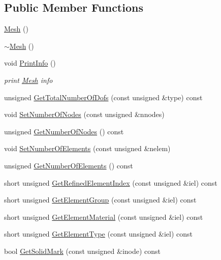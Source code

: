 \subsection*{Public Member Functions}
\begin{DoxyCompactItemize}
\item 
\mbox{\hyperlink{classfemus_1_1_mesh_a9e328b911a0225c8113601ac7aa36947}{Mesh}} ()
\item 
\mbox{\hyperlink{classfemus_1_1_mesh_a265aea095cc8facdfee8323c695fdc34}{$\sim$\+Mesh}} ()
\item 
void \mbox{\hyperlink{classfemus_1_1_mesh_aed86b865485ae162537e960cb5067534}{Print\+Info}} ()
\begin{DoxyCompactList}\small\item\em print \mbox{\hyperlink{classfemus_1_1_mesh}{Mesh}} info \end{DoxyCompactList}\item 
unsigned \mbox{\hyperlink{classfemus_1_1_mesh_afda8ae7465daaa274ea35dac5d8c3dc1}{Get\+Total\+Number\+Of\+Dofs}} (const unsigned \&type) const
\item 
void \mbox{\hyperlink{classfemus_1_1_mesh_aa55f34434829bad6e0fed904a40f271c}{Set\+Number\+Of\+Nodes}} (const unsigned \&nnodes)
\item 
unsigned \mbox{\hyperlink{classfemus_1_1_mesh_af2c24133f4e09b566e6d92bcc3a417c3}{Get\+Number\+Of\+Nodes}} () const
\item 
void \mbox{\hyperlink{classfemus_1_1_mesh_ac3c20a1d205b9f0aff0abb34d5de6d4c}{Set\+Number\+Of\+Elements}} (const unsigned \&nelem)
\item 
unsigned \mbox{\hyperlink{classfemus_1_1_mesh_ab5bcfd4be738d47ae025a06eddc66f61}{Get\+Number\+Of\+Elements}} () const
\item 
short unsigned \mbox{\hyperlink{classfemus_1_1_mesh_a4bb06da5142bf2843a87a6dccca78c3c}{Get\+Refined\+Element\+Index}} (const unsigned \&iel) const
\item 
short unsigned \mbox{\hyperlink{classfemus_1_1_mesh_a7048c3c810f26183680f9f086baf27ae}{Get\+Element\+Group}} (const unsigned \&iel) const
\item 
short unsigned \mbox{\hyperlink{classfemus_1_1_mesh_ad0dcbe941f581f15423a3d5be2ad7cd4}{Get\+Element\+Material}} (const unsigned \&iel) const
\item 
short unsigned \mbox{\hyperlink{classfemus_1_1_mesh_af92bd9944b1d887562b460ede06acf44}{Get\+Element\+Type}} (const unsigned \&iel) const
\item 
bool \mbox{\hyperlink{classfemus_1_1_mesh_ac33a64e1476d69bb9bf7f025f6fc0f7b}{Get\+Solid\+Mark}} (const unsigned \&inode) const

\end{DoxyCompactItemize}
